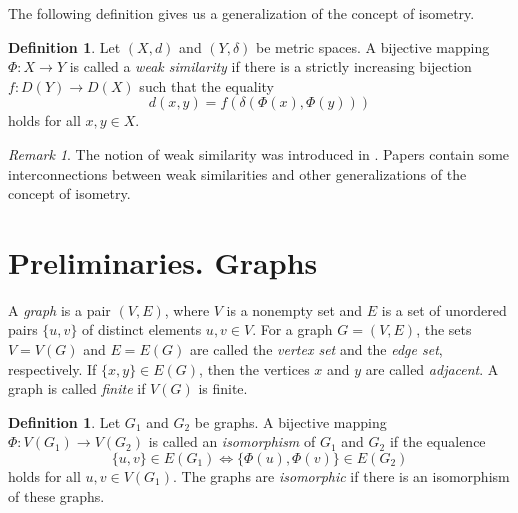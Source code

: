 \documentclass[11pt]{article}
\theoremstyle{definition}
\newtheorem{definition}[theorem]{Definition}
\theoremstyle{remark}
\newtheorem{remark}[theorem]{Remark}
\numberwithin{equation}{section}
\begin{document}
The following definition gives us a generalization of the concept of isometry.

\begin{definition}
\label{scguite}
Let $(X, d)$ and $(Y, \delta)$ be metric spaces.
 A bijective mapping $\Phi\colon X \to Y$ is called a {\it weak similarity} if there is a strictly increasing bijection $f\colon D(Y) \to D(X)$ such that the equality
\begin{equation}\label{joi83}
d(x, y) = f \left( \delta \left( \Phi(x), \Phi(y) \right) \right)
\end{equation}
holds for all $x, y \in X$.
\end{definition}



\begin{remark}
The notion of weak similarity was introduced in \cite{DP2013AMH}. Papers \cite{BD2023BKMS,DovBBMSSS2020,DLAMH2020,Pet2018pNUAA} contain  some interconnections between weak similarities and other generalizations of the concept of isometry.
\end{remark}









\section{Preliminaries. Graphs}





\hspace{5 mm} A \textit{graph} is a pair $(V, E)$, where $V$ is a nonempty set and $E$ is a set of unordered pairs $\{u, v\}$ of distinct elements $u, v \in V$. For a graph $G = (V, E)$, the sets $V = V(G)$ and $E = E(G)$ are called the \textit{vertex set} and the \textit{edge set}, respectively. If $\{x, y\} \in E(G)$, then the vertices $x$ and $y$ are called \textit{adjacent}.  A graph is called \textit{finite} if $V(G)$ is finite. 


\begin{definition}\label{776dcg}
Let $G_1$ and $G_2$ be graphs. A bijective mapping \linebreak
$\Phi \colon V(G_1)\to V(G_2)$
is called an {\it isomorphism} of $G_1$ and $G_2$ if the equalence 
\begin{equation*}
\{u,v\}\in E(G_1)\iff \{\Phi (u),\Phi (v)\}\in E(G_2)
\end{equation*}
holds for all $u,v\in V(G_1)$. 
The graphs are {\it isomorphic} if there is an isomorphism of these graphs.
\end{definition}
\end{document}
